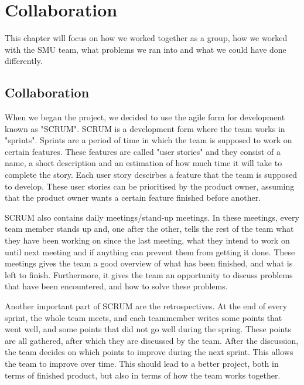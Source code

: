 \chapter{Collaboration}
\label{Collaboration}
This chapter will focus on how we worked together as a group, how we worked with the SMU team, what problems we ran into and what we could have done differently.

\section{Collaboration}
\label{Collaboration_Collaboration}
When we began the project, we decided to use the agile form for development known as "SCRUM". SCRUM is a development form where the team works in "sprints". Sprints are a period of time in which the team is supposed to work on certain features. These features are called "user stories" and they consist of a name, a short description and an estimation of how much time it will take to complete the story. Each user story descirbes a feature that the team is supposed to develop. These user stories can be prioritised by the product owner, assuming that the product owner wants a certain feature finished before another.

SCRUM also contains daily meetings/stand-up meetings. In these meetings, every team member stands up and, one after the other, tells the rest of the team what they have been working on since the last meeting, what they intend to work on until next meeting and if anything can prevent them from getting it done. These meetings gives the team a good overview of what has been finished, and what is left to finish. Furthermore, it gives the team an opportunity to discuss problems that have been encountered, and how to solve these problems.

Another important part of SCRUM are the retrospectives. At the end of every sprint, the whole team meets, and each teammember writes some points that went well, and some points that did not go well during the spring. These points are all gathered, after which they are discussed by the team. After the discussion, the team decides on which points to improve during the next sprint. This allows the team to improve over time. This should lead to a better project, both in terms of finished product, but also in terms of how the team works together.


